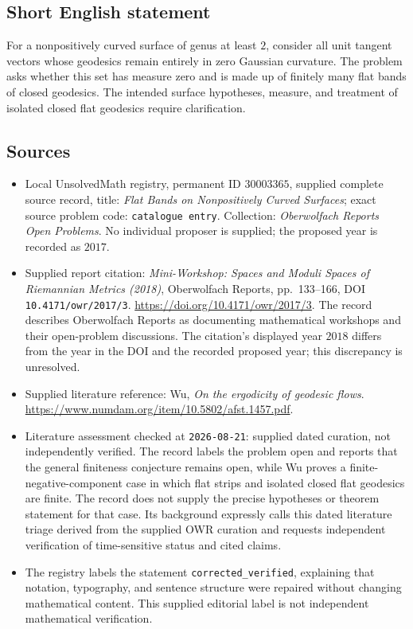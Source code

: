 \documentclass[11pt]{article}
\begin{document}
\subsection{Short English statement}
For a nonpositively curved surface of genus at least \(2\), consider all unit tangent vectors whose geodesics remain entirely in zero Gaussian curvature. The problem asks whether this set has measure zero and is made up of finitely many flat bands of closed geodesics. The intended surface hypotheses, measure, and treatment of isolated closed flat geodesics require clarification.
\subsection{Sources}
\begin{itemize}
\item Local UnsolvedMath registry, permanent ID \(30003365\), supplied complete source record, title: \emph{Flat Bands on Nonpositively Curved Surfaces}; exact source problem code: \texttt{catalogue entry}. Collection: \emph{Oberwolfach Reports Open Problems}. No individual proposer is supplied; the proposed year is recorded as \(2017\).
\item Supplied report citation: \emph{Mini-Workshop: Spaces and Moduli Spaces of Riemannian Metrics (2018)}, Oberwolfach Reports, pp.\ 133--166, DOI \texttt{10.4171/owr/2017/3}. \url{https://doi.org/10.4171/owr/2017/3}. The record describes Oberwolfach Reports as documenting mathematical workshops and their open-problem discussions. The citation's displayed year \(2018\) differs from the year in the DOI and the recorded proposed year; this discrepancy is unresolved.
\item Supplied literature reference: Wu, \emph{On the ergodicity of geodesic flows}. \url{https://www.numdam.org/item/10.5802/afst.1457.pdf}.
\item Literature assessment checked at \texttt{2026-08-21}: supplied dated curation, not independently verified. The record labels the problem open and reports that the general finiteness conjecture remains open, while Wu proves a finite-negative-component case in which flat strips and isolated closed flat geodesics are finite. The record does not supply the precise hypotheses or theorem statement for that case. Its background expressly calls this dated literature triage derived from the supplied OWR curation and requests independent verification of time-sensitive status and cited claims.
\item The registry labels the statement \texttt{corrected\_verified}, explaining that notation, typography, and sentence structure were repaired without changing mathematical content. This supplied editorial label is not independent mathematical verification.
\end{itemize}
\end{document}
